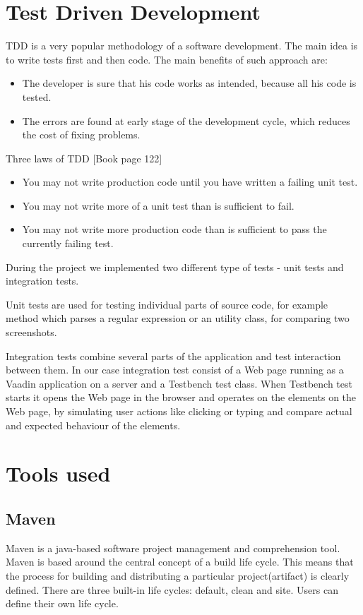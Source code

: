   \section{Test Driven Development}
  TDD is a very popular methodology of a software development. The main idea is
  to write tests first and then code. The main benefits of such approach are:
      \begin{itemize}
        \item The developer is sure that his code works as intended, because all
        his code is tested.
        \item The errors are found at early stage of the development cycle, which
        reduces the cost of fixing problems.
      \end{itemize}
      
      Three laws of TDD \cite[pp122]{cleancode}[Book page 122]
        \begin{itemize}
          \item You may not write production code until you have written a failing unit test.
          \item You may not write more of a unit test than is sufficient to fail.
          \item You may not write more production code than is sufficient to pass the currently failing test.
        \end{itemize}
    
  During the project we implemented two different type of tests - unit tests and
  integration tests. 
  
  Unit tests are used for testing individual parts of source
  code, for example method which parses a regular expression or an utility
  class, for comparing two screenshots.
  
  Integration tests combine several parts of the application and test 
  interaction between them. In our case integration test consist of a Web page
  running as a Vaadin application on a server and a Testbench test class. When
  Testbench test starts it opens the Web page in the browser and operates on the
  elements on the Web page, by simulating user actions like clicking or typing
  and compare actual and expected behaviour of the elements. 
      
  \section {Tools used}
  \label{sec:toolsused}
  
  \subsection{Maven}
  Maven is a java-based software project management and comprehension tool.
  Maven is based around the central concept of a build life cycle. This means
  that the process for building and distributing a particular project(artifact) is clearly defined.
   There are three built-in life cycles:
  default, clean and site. Users can define their own life cycle. 
  
